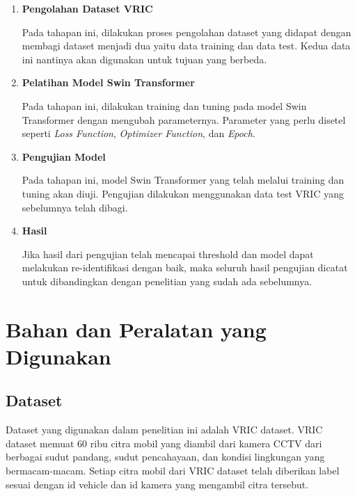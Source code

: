 \begin{enumerate}[nolistsep]

  \item \textbf{Pengolahan Dataset VRIC}
  
  Pada tahapan ini, dilakukan proses pengolahan dataset yang didapat dengan 
  membagi dataset menjadi dua yaitu data training dan data test. Kedua data 
  ini nantinya akan digunakan untuk tujuan yang berbeda.

  \item \textbf{Pelatihan Model Swin Transformer}
  
  Pada tahapan ini, dilakukan training dan tuning pada model Swin Transformer 
  dengan mengubah parameternya. Parameter yang perlu disetel seperti 
  \emph{Loss Function}, \emph{Optimizer Function}, dan \emph{Epoch}.

  \item \textbf{Pengujian Model}
  
  Pada tahapan ini, model Swin Transformer yang telah melalui training dan 
  tuning akan diuji. Pengujian dilakukan menggunakan data test VRIC yang sebelumnya 
  telah dibagi.

  \item \textbf{Hasil}
  
  Jika hasil dari pengujian telah mencapai threshold dan model dapat melakukan \linebreak
  re-identifikasi dengan baik, maka seluruh hasil pengujian dicatat untuk dibandingkan 
  dengan penelitian yang sudah ada sebelumnya.

\end{enumerate}

\section{Bahan dan Peralatan yang Digunakan}
\label{sec:bahandanperalatanyangdigunakan}

\subsection{Dataset}

Dataset yang digunakan dalam penelitian ini adalah VRIC dataset. VRIC dataset memuat 
60 ribu citra mobil yang diambil dari kamera CCTV dari berbagai sudut pandang, sudut 
pencahayaan, dan kondisi lingkungan yang bermacam-macam. Setiap citra mobil dari VRIC 
dataset telah diberikan label sesuai dengan id vehicle dan id kamera yang mengambil 
citra tersebut.

